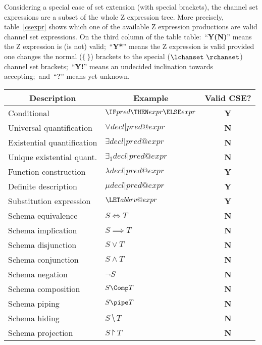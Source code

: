 \documentclass{article}
\begin{document}
Considering  a special case of set extension (with special brackets),
the channel set expressions are a subset of the whole Z expression tree. More precisely, table~\ref{csexpr}
shows which one of the available Z expression productions are valid channel set expressions. On the third column
of the table table:~``\textbf{Y(N)}'' means the Z expression is (is not) valid;~``\textbf{Y*}'' means the Z expression
is valid provided one changes the normal ($\{~\}$) brackets to the special ($\lchanset~\rchanset$) channel set
brackets;~``\textbf{Y!}'' means an undecided inclination towards accepting;~and~``\textbf{?}'' means yet unknown.
%
\begin{table}[h]
\begin{tabular}{|l|l|c|}
\hline
\multicolumn{1}{|c|}{\textbf{Description}} & \multicolumn{1}{c|}{\textbf{Example}} & \textbf{Valid CSE?} \\
\hline
Conditional & $\IF pred \THEN expr \ELSE expr$ & \textbf{Y} \\
\hline
Universal quantification & $\forall decl | pred @ expr$ & \textbf{N} \\
\hline
Existential quantification & $\exists decl | pred @ expr$ & \textbf{N} \\
\hline
Unique existential quant. & $\exists_1 decl | pred @ expr$ & \textbf{N} \\
\hline
Function construction & $\lambda decl | pred @ expr$ & \textbf{Y} \\
\hline
Definite description & $\mu decl | pred @ expr$ & \textbf{Y} \\
\hline
Substitution expression & $\LET abbrv @ expr$ & \textbf{Y} \\
\hline
Schema equivalence & $S \iff T$ & \textbf{N} \\
\hline
Schema implication & $S \implies T$ & \textbf{N} \\
\hline
Schema disjunction & $S \lor T$ & \textbf{N} \\
\hline
Schema conjunction & $S \land T$ & \textbf{N} \\
\hline
Schema negation & $\lnot S$ & \textbf{N} \\
\hline
Schema composition & $S \Comp T$ & \textbf{N} \\
\hline
Schema piping & $S \pipe T$ & \textbf{N} \\
\hline
Schema hiding & $S \hide T$ & \textbf{N} \\
\hline
Schema projection & $S \project T$ & \textbf{N} \\

\end{tabular}
\end{table}
\end{document}
